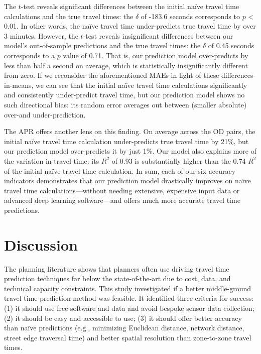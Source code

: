 \documentclass[12pt,letterpaper]{article} %
\begin{document}
The $t$-test reveals significant differences between the initial naïve travel time calculations and the true travel times: the $\delta$ of -183.6 seconds corresponds to $p$ < 0.01. In other words, the naïve travel time under-predicts true travel time by over 3 minutes. However, the $t$-test reveals insignificant differences between our model's out-of-sample predictions and the true travel times: the $\delta$ of 0.45 seconds corresponds to a $p$ value of 0.71. That is, our prediction model over-predicts by less than half a second on average, which is statistically insignificantly different from zero. If we reconsider the aforementioned MAEs in light of these differences-in-means, we can see that the initial naïve travel time calculations significantly and consistently under-predict travel time, but our prediction model shows no such directional bias: its random error averages out between (smaller absolute) over-and under-prediction.

The APR offers another lens on this finding. On average across the OD pairs, the initial naïve travel time calculation under-predicts true travel time by 21\%, but our prediction model over-predicts it by just 1\%. Our model also explains more of the variation in travel time: its $R^2$ of 0.93 is substantially higher than the 0.74 $R^2$ of the initial naïve travel time calculation. In sum, each of our six accuracy indicators demonstrates that our prediction model drastically improves on naïve travel time calculations---without needing extensive, expensive input data or advanced deep learning software---and offers much more accurate travel time predictions.

\section{Discussion}

The planning literature shows that planners often use driving travel time prediction techniques far below the state-of-the-art due to cost, data, and technical capacity constraints. This study investigated if a better middle-ground travel time prediction method was feasible. It identified three criteria for success: (1) it should use free software and data and avoid bespoke sensor data collection; (2) it should be easy and accessible to use; (3) it should offer better accuracy than naïve predictions (e.g., minimizing Euclidean distance, network distance, street edge traversal time) and better spatial resolution than zone-to-zone travel times.
\end{document}
